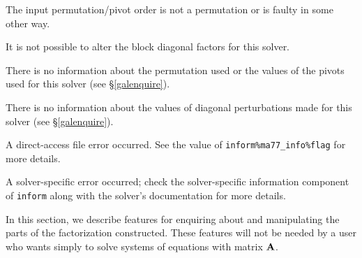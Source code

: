 \documentclass{galahad}
\begin{document}
\begin{description}
  The input permutation/pivot order is not a permutation or is
    faulty in some other way.

 It is not possible to alter the block diagonal factors for this
   solver.

 There is no information about the permutation used or the values
   of the pivots used for this solver (see \S\ref{galenquire}).

 There is no information about the values of diagonal
    perturbations made for this solver (see \S\ref{galenquire}).

 A direct-access file error occurred. See the value of
    {\tt inform\%ma77\_info\%flag} for more details.

 A solver-specific error occurred; check the solver-specific
  information component of {\tt inform} along with the solver's documentation
  for more details.

\end{description}


\galfeatures
\noindent In this section, we describe features for enquiring about and
manipulating the parts of the factorization constructed. These features
will not be needed by a user who wants simply to solve systems of
equations with matrix ${\mathbf{A}}$.
\end{document}
